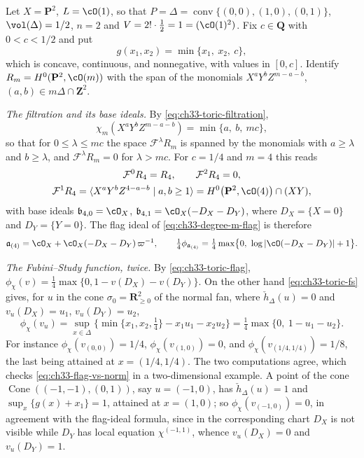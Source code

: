 \begin{example}
\label{ex:ch33-toric-p2}
Let $X=\mathbf P^2$, $L=\cO(1)$, so that
$P=\Delta=\operatorname{conv}\{(0,0),(1,0),(0,1)\}$,
$\vol(\Delta)=1/2$, $n=2$ and $V=2!\cdot\tfrac12=1=(\cO(1)^2)$.  Fix
$c\in\mathbf Q$ with $0<c<1/2$ and put
\[
 g(x_1,x_2)=\min\{x_1,\ x_2,\ c\} ,
\]
which is concave, continuous, and nonnegative, with values in $[0,c]$.
Identify $R_m=H^0(\mathbf P^2,\cO(m))$ with the span of the monomials
$X^aY^bZ^{m-a-b}$, $(a,b)\in m\Delta\cap\mathbf Z^2$.

\emph{The filtration and its base ideals.}  By
\eqref{eq:ch33-toric-filtration},
\[
 \chi_m(X^aY^bZ^{m-a-b})=\min\{a,\ b,\ mc\} ,
\]
so that for $0\leq\lambda\leq mc$ the space
$\mathcal F^\lambda R_m$ is spanned by the monomials with
$a\geq\lambda$ and $b\geq\lambda$, and
$\mathcal F^\lambda R_m=0$ for $\lambda>mc$.  For
$c=1/4$ and $m=4$ this reads
\[
\begin{gathered}
 \mathcal F^0R_4=R_4,\qquad
 \mathcal F^2R_4=0 ,\\
 \mathcal F^1R_4=\langle X^aY^bZ^{4-a-b}\mid a,b\geq1\rangle
 =H^0\bigl(\mathbf P^2,\cO(4)\bigr)\cap(XY),
\end{gathered}
\]
with base ideals $\mathfrak b_{4,0}=\cO_X$,
$\mathfrak b_{4,1}=\cO_X(-D_X-D_Y)$, where $D_X=\{X=0\}$ and
$D_Y=\{Y=0\}$.  The flag ideal of
\eqref{eq:ch33-degree-m-flag} is therefore
\begin{equation}
\label{eq:ch33-toric-flag}
 \mathfrak a_{(4)}
 =\cO_X+\cO_X(-D_X-D_Y)\,\varpi^{-1},
 \qquad
 \tfrac14\phi_{\mathfrak a_{(4)}}
 =\tfrac14\max\bigl\{0,\ \log|\cO(-D_X-D_Y)|+1\bigr\} .
\end{equation}

\emph{The Fubini--Study function, twice.}  By \eqref{eq:ch33-toric-flag},
$\phi_\chi(v)=\tfrac14\max\{0,1-v(D_X)-v(D_Y)\}$.  On the other hand
\eqref{eq:ch33-toric-fs} gives, for $u$ in the cone
$\sigma_0=\mathbf R_{\geq0}^2$ of the normal fan, where
$\check h_\Delta(u)=0$ and $v_u(D_X)=u_1$, $v_u(D_Y)=u_2$,
\[
 \phi_\chi(v_u)
 =\sup_{x\in\Delta}\bigl\{\min\{x_1,x_2,\tfrac14\}
      -x_1u_1-x_2u_2\bigr\}
 =\tfrac14\max\{0,\ 1-u_1-u_2\} .
\]
For instance $\phi_\chi(v_{(0,0)})=1/4$,
$\phi_\chi(v_{(1,0)})=0$, and
$\phi_\chi(v_{(1/4,1/4)})=1/8$, the last being attained at
$x=(1/4,1/4)$.  The two computations agree, which checks
\eqref{eq:ch33-flag-vs-norm} in a two-dimensional example.  A point of the
cone $\operatorname{Cone}((-1,-1),(0,1))$, say $u=(-1,0)$, has
$\check h_\Delta(u)=1$ and $\sup_{x}\{g(x)+x_1\}=1$, attained at
$x=(1,0)$; so $\phi_\chi(v_{(-1,0)})=0$, in agreement with the
flag-ideal formula, since in the corresponding chart $D_X$ is not
visible while $D_Y$ has local equation $\chi^{(-1,1)}$, whence
$v_u(D_X)=0$ and $v_u(D_Y)=1$.


\end{example}
